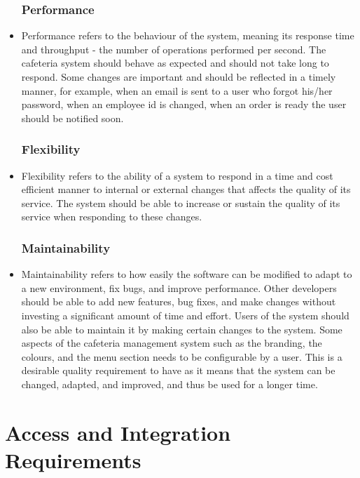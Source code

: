 \documentclass[a4paper,12pt]{article}
\begin{document}
\begin{itemize}
\subsubsection{Performance}
\item  Performance refers to the behaviour of the system, meaning its response time and throughput - the number of operations performed per second. The cafeteria system should behave as expected and should not take long to respond. Some changes are important and should be reflected in a timely manner, for example, when an email is sent to a user who forgot his/her password, when an employee id is changed, when an order is ready the user should be notified soon.

\subsubsection{Flexibility}
\item  Flexibility refers to the ability of a system to respond in a time and cost efficient manner to internal or external changes that affects the quality of its service. The system should be able to increase or sustain the quality of its service when responding to these changes.

\subsubsection{Maintainability}
\item  Maintainability refers to how easily the software can be modified to adapt to a new environment, fix bugs, and improve performance. Other developers should be able to add new features, bug fixes, and make changes without investing a significant amount of time and effort. Users of the system should also be able to maintain it by making certain changes to the system. Some aspects of the cafeteria management system such as the branding, the colours, and the menu section needs to be configurable by a user. This is a desirable quality requirement to have as it means that the system can be changed, adapted, and improved, and thus be used for a longer time.
\end{itemize}


\section{Access and Integration Requirements}\
\end{document}
